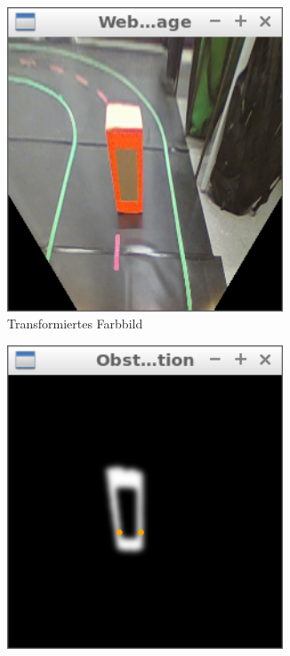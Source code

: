 \begin{figure}
	\centering
	\begin{subfigure}{0.45\textwidth}
		\centering
		\includegraphics[width=0.9\textwidth]{images/obstacle_original.png}
		\caption{Transformiertes Farbbild}
	\end{subfigure}
	\begin{subfigure}{0.45\textwidth}
		\centering
		\includegraphics[width=0.9\textwidth]{images/obstacle_alone_bw.png}

\end{subfigure}
\end{figure}
